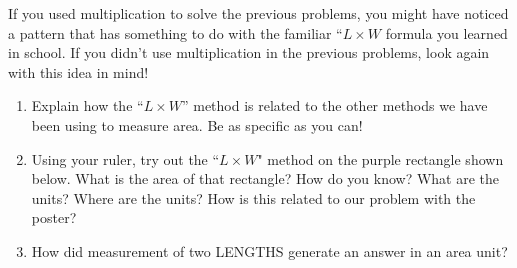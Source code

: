 \documentclass[nooutcomes,handout,noauthor]{ximera}
\begin{document}
\newpage

\begin{problem}
If you used multiplication to solve the previous problems, you might have noticed a pattern that has something to do with the familiar ``$L \times W$ formula you learned in school. If you didn't use multiplication in the previous problems, look again with this idea in mind!
\begin{enumerate} 
\item Explain how the ``$L \times W$'' method is related to the other methods we have been using to measure area. Be as specific as you can!
\item Using your ruler, try out the ``$L \times W$" method on the purple rectangle shown below.  What is the area of that rectangle?  How do you know?  What are the units? Where are the units? How is this related to our problem with the poster?

\begin{image}
\end{image}


\item How did measurement of two LENGTHS generate an answer in an area unit?
\end{enumerate}
\end{problem}

\newpage
\end{document}
